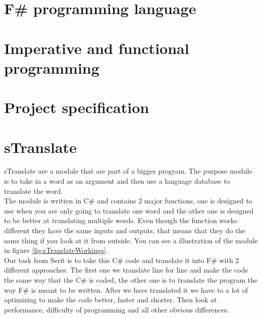 \documentclass[12pt, a4paper]{article}
\begin{document}
\newpage

\section{F\# programming language}
\newpage

\section{Imperative and functional programming}
\newpage

\section{Project specification}
\newpage

\section{sTranslate}
sTranslate are a module that are part of a bigger program. The purpose module is to take in a word as an argument and then use a language database to translate the word.\\

The module is written in C\# and contains 2 major functions, one is designed to use when you are only going to translate one word and the other one is designed to be better at translating multiple words. Even though the function works different they have the same inputs and outputs, that means that they do the same thing if you look at it from outside. You can see a illustration of the module in figure \ref{fig:sTranslateWorkings}.\\

Our task from Serit is to take this C\# code and translate it into F\# with 2 different approaches. The first one we translate line for line and make the code the same way that the C\# is coded, the other one is to translate the program the way F\# is meant to be written. After we have translated it we have to a lot of optimizing to make the code better, faster and shorter. Then look at performance, difficulty of programming and all other obvious differences.\\
\end{document}
